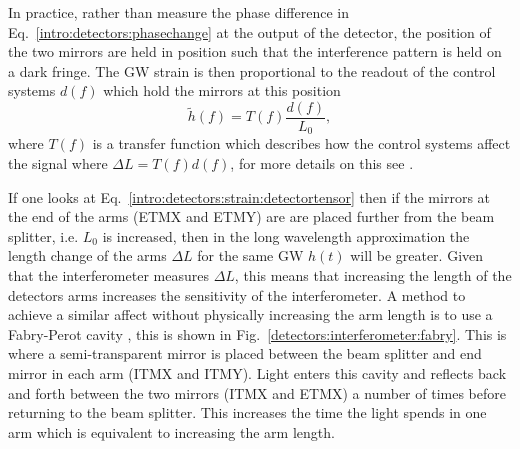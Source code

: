 In practice, rather than measure the phase difference in Eq.~\ref{intro:detectors:phasechange} at the output of the detector, the position of the two mirrors are held in position such that the interference pattern is held on a dark fringe.
%
%
The \gls{GW} strain is then proportional to the readout of the control systems $d(f)$ which hold the mirrors at this position \cite{ligoscientificcollaboration2017CalibrationAdvanced} 
\begin{equation}
    \tilde{h}(f) = T(f) \frac{d(f)}{L_0},
\end{equation}
where $T(f)$ is a transfer function which describes how the control systems affect the signal where $\Delta L = T(f) d(f)$, for more details on this see \cite{ligoscientificcollaboration2017CalibrationAdvanced}.

If one looks at Eq.~\ref{intro:detectors:strain:detectortensor} then if the mirrors at the
end of the arms (\gls{ETMX} and \gls{ETMY}) are are placed
further from the beam splitter, i.e. $L_0$ is increased, then in the long wavelength approximation the length change
of the arms $\Delta L$ for the same \gls{GW} $h(t)$ will be greater.  Given that the interferometer measures $\Delta L$, this means that
increasing the length of the detectors arms increases the sensitivity of the
interferometer.  A method to achieve a similar affect without physically
increasing the arm length is to use a Fabry-Perot cavity
\citep{aasi2015AdvancedLIGO}, this is shown in
Fig.~\ref{detectors:interferometer:fabry}.  This is where a semi-transparent
mirror is placed between the beam splitter and end mirror in each arm (\gls{ITMX} and
\gls{ITMY}).  Light enters this cavity and reflects
back and forth between the two mirrors (\gls{ITMX} and \gls{ETMX}) a number of times before
returning to the beam splitter.  This increases the time the light spends in
one arm which is equivalent to increasing the arm length.  

